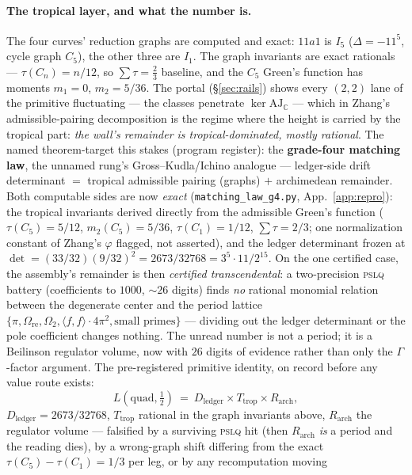 \documentclass[11pt]{article}
\theoremstyle{definition}
\theoremstyle{remark}
\begin{document}
\paragraph{The tropical layer, and what the number is.} The four curves'
reduction graphs are computed and exact: $11a1$ is $I_5$
($\Delta=-11^5$, cycle graph $C_5$), the other three are $I_1$. The graph
invariants are exact rationals --- $\tau(C_n)=n/12$, so
$\sum\tau=\tfrac{2}{3}$ baseline, and the $C_5$ Green's function has moments
$m_1=0$, $m_2=5/36$. The portal (\S\ref{sec:rails}) shows every $(2,2)$ lane
of the primitive fluctuating --- the classes penetrate
$\ker\mathrm{AJ}_{\mathbb C}$ --- which in Zhang's admissible-pairing
decomposition \cite{ZhangGS} is the regime where the height is carried by the
tropical part: \emph{the wall's remainder is tropical-dominated, mostly
rational}. The named theorem-target this stakes (program register): the
\textbf{grade-four matching law}, the unnamed rung's Gross--Kudla/Ichino
analogue --- ledger-side drift determinant $=$ tropical admissible pairing
(graphs) $+$ archimedean remainder. Both computable sides are now
\emph{exact} (\texttt{matching\_law\_g4.py}, App.~\ref{app:repro}): the
tropical invariants derived directly from the admissible Green's function
($\tau(C_5)=5/12$, $m_2(C_5)=5/36$, $\tau(C_1)=1/12$, $\sum\tau=2/3$; one
normalization constant of Zhang's $\varphi$ flagged, not asserted), and the
ledger determinant frozen at $\det=(33/32)(9/32)^2=2673/32768=3^5\cdot
11/2^{15}$. On the one certified case, the assembly's remainder is then
\emph{certified transcendental}: a two-precision \textsc{pslq} battery
(coefficients to $1000$, $\sim\!26$ digits) finds \emph{no} rational
monomial relation between the degenerate center and the period lattice
$\{\pi,\Omega_{\mathrm{re}},\Omega_2,\langle f,f\rangle\cdot4\pi^2,
\text{small primes}\}$ --- dividing out the ledger determinant or the pole
coefficient changes nothing. The unread number is not a period; it is a
Beilinson regulator volume, now with $26$ digits of evidence rather than
only the $\Gamma$-factor argument. The pre-registered primitive identity,
on record before any value route exists:
\[
  L(\mathrm{quad},\tfrac12)\ =\ D_{\mathrm{ledger}}\times T_{\mathrm{trop}}
  \times R_{\mathrm{arch}},
\]
$D_{\mathrm{ledger}}=2673/32768$, $T_{\mathrm{trop}}$ rational in the graph
invariants above, $R_{\mathrm{arch}}$ the regulator volume --- falsified by
a surviving \textsc{pslq} hit (then $R_{\mathrm{arch}}$ \emph{is} a period
and the reading dies), by a wrong-graph shift differing from the exact
$\tau(C_5)-\tau(C_1)=1/3$ per leg, or by any recomputation moving
\end{document}
